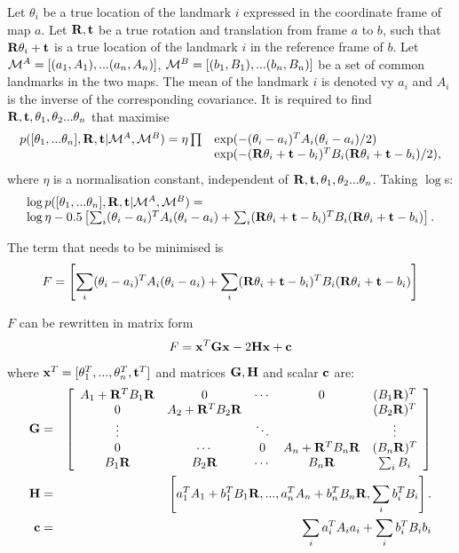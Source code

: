 Let $\theta_i$ be a true location of the landmark $i$ expressed in the
coordinate frame of map $a$. Let ${\bf R,t}$ be a true rotation and
translation from frame $a$ to $b$, such that ${\bf R}\theta_i + {\bf t}$
is a true location of the landmark $i$ in the reference frame of
$b$. Let $\mapA=[(a_1,A_1),...(a_n,A_n)]$,
$\mapB=[(b_1,B_1),...(b_n,B_n)]$ be a set of common landmarks in the two
maps. The mean of the landmark $i$ is denoted vy $a_i$ and $A_i$ is the
inverse of the corresponding covariance. It is required to find ${\bf
R,t},\theta_1, \theta_2 ...\theta_n$ that maximise
\begin{equation}
\begin{array}{ll}
p([\theta_1, ...\theta_n],{\bf R},{\bf t} | \mapA, \mapB) =
 \eta \prod& \exp(-(\theta_i - a_i)^T A_i (\theta_i - a_i)/2)\\
&\exp(-({\bf R}\theta_i + {\bf t} - b_i)^T B_i
({\bf R}\theta_i + {\bf t} - b_i)/2),
\label{eqn:align_w0}
\end{array}
\end{equation}
where $\eta$ is a normalisation constant, independent of ${\bf
R,t},\theta_1, \theta_2 ...\theta_n$. Taking $\log$s: 
\begin{equation}
\begin{array}{l}
\log p([\theta_1, ...\theta_n],{\bf R},{\bf t} | \mapA, \mapB) =\\
\log\eta - 0.5 \left[
\sum_i (\theta_i - a_i)^T A_i (\theta_i - a_i) +
\sum_i ({\bf R}\theta_i + {\bf t} - b_i)^T B_i({\bf R}\theta_i + {\bf t} - b_i)
\right].
\end{array}
\label{eqn:align_log_prob}
\end{equation}

The term that needs to be minimised is
$$
F = \left[ \sum_i (\theta_i - a_i)^T A_i (\theta_i - a_i) +
\sum_i ({\bf R}\theta_i + {\bf t} - b_i)^T B_i ({\bf R}\theta_i + {\bf t} - b_i)
\right]
$$

$F$ can be rewritten in matrix form
$$
F =  {\bf x}^T{\bf Gx} -2{\bf Hx} + {\bf c}
$$
where ${\bf x}^T = [\theta_1^T,...,\theta_n^T, {\bf t}^T]$ and
matrices ${\bf G},{\bf H}$ and scalar ${\bf c}$ are:
\begin{eqnarray}
{\bf G} &=& \left[ \begin{array}{ccccc}
A_1 + {\bf R}^TB_1{\bf R}&
0&\cdots&0&
(B_1{\bf R})^T\\
0&A_2 + {\bf R}^TB_2{\bf R}&&&(B_2{\bf R})^T\\
\vdots & & \ddots & & \vdots\\
0&\cdots&0&
A_n + {\bf R}^TB_n{\bf R}&
(B_n{\bf R})^T\\
B_1{\bf R}&B_2{\bf R}&\cdots&
B_n{\bf R}&
\sum_i B_i
\end{array} \right]\\
{\bf H}  &=& \left[a_1^TA_1+b_1^TB_1{\bf  R},...,
a_n^TA_n+b_n^TB_n{\bf R},
\sum_i b_i^TB_i
 \right].\\
{\bf c} &=& \sum_i a_i^TA_ia_i + \sum_i b_i^TB_ib_i
\end{eqnarray}

